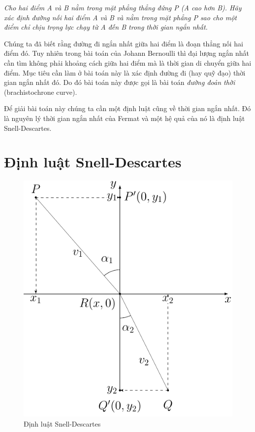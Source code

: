 \documentclass{mynotes}
\begin{document}
\textit{Cho hai điểm A và B nằm trong mặt phẳng thẳng đứng P (A cao hơn B). Hãy 
    xác định đường nối hai điểm A và B và nằm trong mặt phẳng P sao cho một 
    điểm chỉ chịu trọng lực chạy từ A đến B trong thời gian ngắn nhất.}

Chúng ta đã biết rằng đường đi ngắn nhất giữa hai điểm là đoạn thẳng nối hai điểm đó. Tuy nhiên trong bài toán của Johann Bernoulli thì đại lượng ngắn nhất cần tìm không phải khoảng cách giữa hai điểm mà là thời gian di chuyển giữa hai điểm. Mục tiêu cần làm ở bài toán này là xác định đường đi (hay quỹ đạo) thời gian ngắn nhất đó. Do đó bài toán này được gọi là bài toán \textit{đường đoản thời} (brachistochrone curve).

Để giải bài toán này chúng ta cần một định luật cũng về thời gian ngắn nhất. Đó là nguyên lý thời gian ngắn nhất của Fermat và một hệ quả của nó là định luật Snell-Descartes.

\section*{Định luật Snell-Descartes}

\begin{figure}[ht]
    \centering
    \includegraphics{brachistochrone/fermat.pdf}
    \caption{Định luật Snell-Descartes}
    \label{cycloid:snell}
\end{figure}
\end{document}
